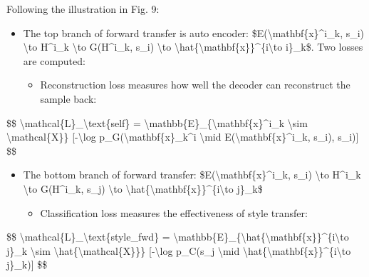 Following the illustration in Fig. 9:

\begin{itemize}
\tightlist
\item
  The top branch of forward transfer is auto encoder: \hspace{0pt}\$E(\textbackslash mathbf\{x\}\^{}i\_k, s\_i) \textbackslash to H\^{}i\_k \textbackslash to G(H\^{}i\_k, s\_i) \textbackslash to \textbackslash hat\{\textbackslash mathbf\{x\}\}\^{}\{i\textbackslash to i\}\_k\$. Two losses are computed:

  \begin{itemize}
  \tightlist
  \item
    Reconstruction loss measures how well the decoder can reconstruct the sample back:
  \end{itemize}
\end{itemize}

\$\$ \textbackslash mathcal\{L\}\_\textbackslash text\{self\} = \textbackslash mathbb\{E\}\_\{\textbackslash mathbf\{x\}\^{}i\_k \textbackslash sim \textbackslash mathcal\{X\}\} {[}-\textbackslash log p\_G(\textbackslash mathbf\{x\}\_k\^{}i \textbackslash mid E(\textbackslash mathbf\{x\}\^{}i\_k, s\_i), s\_i){]} \$\$

\begin{itemize}
\tightlist
\item
  The bottom branch of forward transfer: \$E(\textbackslash mathbf\{x\}\^{}i\_k, s\_i) \textbackslash to H\^{}i\_k \textbackslash to G(H\^{}i\_k, s\_j) \textbackslash to \textbackslash hat\{\textbackslash mathbf\{x\}\}\^{}\{i\textbackslash to j\}\_k\$

  \begin{itemize}
  \tightlist
  \item
    Classification loss measures the effectiveness of style transfer:
  \end{itemize}
\end{itemize}

\$\$ \textbackslash mathcal\{L\}\_\textbackslash text\{style\_fwd\} = \textbackslash mathbb\{E\}\_\{\textbackslash hat\{\textbackslash mathbf\{x\}\}\^{}\{i\textbackslash to j\}\_k \textbackslash sim \textbackslash hat\{\textbackslash mathcal\{X\}\}\} {[}-\textbackslash log p\_C(s\_j \textbackslash mid \textbackslash hat\{\textbackslash mathbf\{x\}\}\^{}\{i\textbackslash to j\}\_k){]} \$\$

